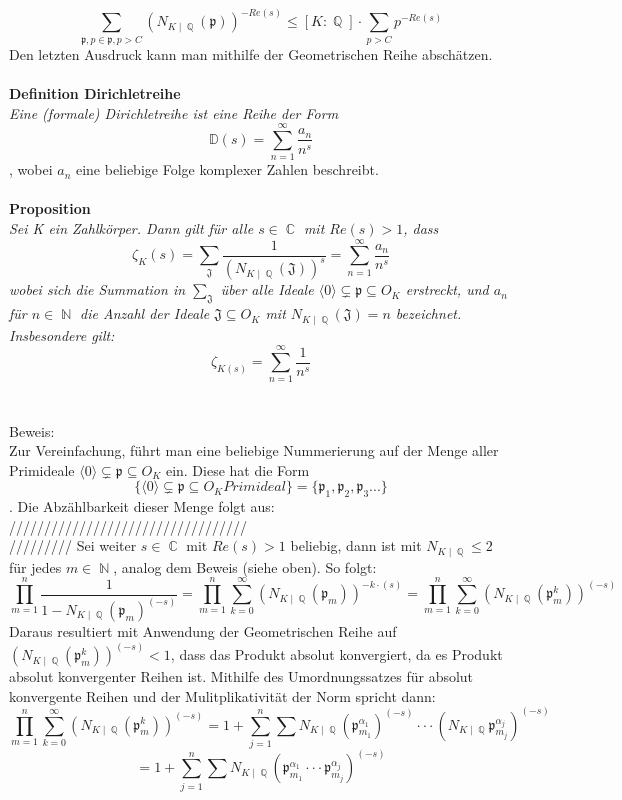 \documentclass[10pt,a4paper]{article}
\DeclareMathOperator{\C}{\mathbb{C}}
\DeclareMathOperator{\Q}{\mathbb{Q}}
\DeclareMathOperator{\N}{\mathbb{N}}
\begin{document}
$$\sum_{\mathfrak{p},p\in \mathfrak{p},p>C}(N_{K\mid \Q}(\mathfrak{p}))^{-Re(s)} \leq [K\colon\Q]\cdot \sum_{p>C}p^{-Re(s)} $$ Den letzten Ausdruck kann man mithilfe der Geometrischen Reihe abschätzen.
\\
\\
\textbf{Definition Dirichletreihe}
\\
\textit{Eine (formale) Dirichletreihe ist eine Reihe der Form $$\mathbb{D}(s) = \sum_{n =1}^{\infty}\frac{a_n}{n^s} $$}, wobei $a_n$ eine beliebige Folge komplexer Zahlen beschreibt.
\\
\\
\textbf{Proposition}
\\
\textit{Sei K ein Zahlkörper. Dann gilt für alle $s \in \C$ mit $Re(s)>1$, dass$$\zeta_{K}(s) = \sum_{\mathfrak{J}}\frac{1}{(N_{K\mid\Q}(\mathfrak{J}))^s}=\sum_{n=1}^{\infty}\frac{a_n}{n^s}$$
wobei sich die Summation in $\sum_{\mathfrak{J}}$ über alle Ideale $\langle0\rangle\subsetneq \mathfrak{p} \subseteq O_{\textit{K}}$ erstreckt, und $a_n$ für $n \in \N$ die Anzahl der Ideale $\mathfrak{J} \subseteq O_K$ mit $N_{K\mid \Q}(\mathfrak{J}) = n$ bezeichnet. Insbesondere gilt: $$\zeta_{K(s)}= \sum_{n=1}^{\infty}\frac{1}{n^s}$$}
\\
\\
Beweis:
\\
Zur Vereinfachung, führt man eine beliebige Nummerierung auf der Menge aller Primideale $\langle0\rangle\subsetneq \mathfrak{p} \subseteq O_{\textit{K}}$ ein. Diese hat die Form $$\{\langle0\rangle\subsetneq \mathfrak{p} \subseteq O_{\textit{K}} Primideal \}=\{\mathfrak{p}_1,\mathfrak{p}_2,\mathfrak{p}_3...\}$$. Die Abzählbarkeit dieser Menge folgt aus: //////////////////////////////////
\\/////////
Sei weiter $s \in \C$ mit $Re(s) > 1$ beliebig, dann ist mit $N_{K\mid \Q}\leq 2$ für jedes $m \in \N$, analog dem Beweis (siehe oben). So folgt:$$\prod_{m=1}^{n}\frac{1}{1-N_{K\mid \Q}(\mathfrak{p}_m)^{(-s)}} =\prod_{m=1}^{n}\sum_{k=0}^{\infty}(N_{K\mid \Q}(\mathfrak{p}_m))^{-k\cdot(s)}=\prod_{m=1}^{n}\sum_{k=0}^{\infty}(N_{K\mid \Q}(\mathfrak{p}_m^k))^{(-s)}$$
Daraus resultiert mit Anwendung der Geometrischen Reihe auf$(N_{K\mid \Q}(\mathfrak{p}_m^k))^{(-s)} < 1$, dass das Produkt absolut konvergiert, da es Produkt absolut konvergenter Reihen ist. Mithilfe des Umordnungssatzes für absolut konvergente Reihen und der Mulitplikativität der Norm spricht dann:
$$\prod_{m=1}^{n}\sum_{k=0}^{\infty}(N_{K\mid \Q}(\mathfrak{p}_m^k))^{(-s)}=1+\sum_{j=1}^{n}\sum N_{K\mid \Q}(\mathfrak{p}_{m_1}^{\alpha_1})^{(-s)}\cdot\cdot\cdot(N_{K\mid \Q}\mathfrak{p}_{m_j}^{\alpha_j})^{(-s)}$$ $$=1+\sum_{j=1}^{n}\sum N_{K\mid \Q}(\mathfrak{p}_{m_1}^{\alpha_1}\cdot\cdot\cdot\mathfrak{p}_{m_j}^{\alpha_j})^{(-s)}$$
\end{document}
